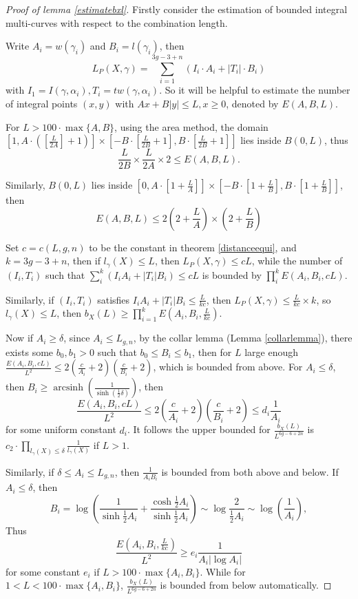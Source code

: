 \begin{proof}[Proof of lemma \ref{estimatebxl}]
Firstly consider the estimation of bounded integral multi-curves with   respect to the combination length. 

Write $A_i=w(\gamma_i)$ and $B_i=l(\gamma_i)$, then
$$L_P(X,\gamma)=\sum_{i=1}^{3g-3+n} (I_i\cdot A_i+|T_i|\cdot B_i )$$
with $I_1=I(\gamma,\alpha_i),T_i=tw(\gamma,\alpha_i).$ So it will be helpful to estimate the number of  integral points $(x,y)$ with $Ax+B|y|\leq L, x\geq 0$, denoted by $E(A,B,L)$.

 For $L>100\cdot \max\{A,B\}$,  using the area method,  the domain $[1,A\cdot ([\frac{L}{2A}]+1)]\times [-B\cdot[\frac{L}{2B}+1],B\cdot [\frac{L}{2B}+1]]
 $
 lies inside $B(0,L)$, thus \begin{equation}
    \frac{L}{2B}\times \frac{L}{2A}\times 2\leq E(A,B,L).
 \end{equation}

 
 Similarly, $B(0,L)$ lies inside $[0,A\cdot [1+\frac{L}{A}]]\times [-B\cdot[1+\frac{L}{B}],B\cdot [1+\frac{L}{B}]]$, then \begin{equation}
     E(A,B,L)\leq 2(2+\frac{L}{A})\times (2+\frac{L}{B})
 \end{equation}
 
 Set $c=c(L,g,n)$ to be the constant in theorem \ref{distanceequi}, and $k=3g-3+n$, then if $l_\gamma(X)\leq L$, then $L_P(X,\gamma)\leq cL$, while the number of $(I_i,T_i)$ such that $\sum_{i}^k (I_iA_i+|T_i|B_i)\leq cL $ is bounded by $\prod_i^k E(A_i,B_i,cL)$.

Similarly, if $(I_i,T_i)$ satisfies $I_iA_i+|T_i|B_i\leq \frac{L}{kc}$, then $L_P(X,\gamma)\leq \frac{L}{kc}\times k$, so $l_\gamma(X)\leq L$, then $b_X(L)\geq \prod_{i=1}^kE(A_i,B_i,\frac{L}{kc})$.

Now if $A_i\geq \delta$, since $A_i\leq L_{g,n}$, by the collar lemma (Lemma \ref{collarlemma}), there exists some $b_0,b_1>0$ such that $b_0\leq B_i\leq b_1$, then for $L$ large enough $\frac{E(A_i,B_i,cL)}{L^2}\leq 2(\frac{c}{A_i}+2)(\frac{c}{B_i}+2)$, which is bounded from above. For $A_i\leq \delta$,  then $B_i\geq \operatorname{arcsinh}(\frac{1}{\sinh(\frac{1}{2}\delta)})$, then $$\frac{E(A_i,B_i,cL)}{L^2}\leq2(\frac{c}{A_i}+2)(\frac{c}{B_i}+2) \leq d_i\frac{1}{A_i}$$ for some uniform constant $d_i$.  It follows the upper bounded for $\frac{b_X(L)}{L^{6g-6+2n}}$ is $c_2\cdot \prod_{l_\gamma(X)\leq \delta}\frac{1}{l_\gamma(X)}$ if  $L>1$. 

Similarly, if $\delta\leq A_i\leq L_{g,n}$, then $\frac{1}{A_iB_i}$ is bounded from both above and below. If $A_i\leq \delta$, then $$B_i=\log(\frac{1}{\sinh \frac{1}{2}A_i}+\frac{\cosh \frac{1}{2}A_i}{\sinh \frac{1}{2}A_i})\sim \log\frac{2}{\frac{1}{2}A_i}\sim \log(\frac{1}{A_i}),$$ Thus $$\frac{E(A_i,B_i,\frac{L}{kc})}{L^2}\geq e_i\frac{1}{A_i|\log A_i|}$$ for some  constant $e_i$ if $L>100\cdot \max\{A_i,B_i\}$. While for $1<L<100 \cdot\max\{A_i,B_i\}$, $
\frac{b_X(L)}{L^{6g-6+2n}}$ is bounded from below automatically. 
\end{proof}

